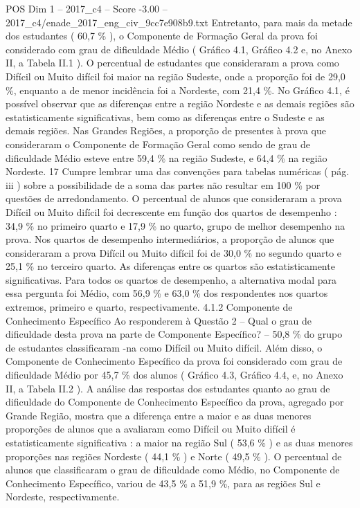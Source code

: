 \begin{textsample}{POS Dim 1 – 2017\_c4 – Score -3.00 – 2017\_c4/enade\_2017\_eng\_civ\_9cc7e908b9.txt}
Entretanto, para mais da metade dos estudantes ( 60,7 \% ), o Componente de Formação Geral da prova foi considerado com grau de dificuldade Médio ( Gráfico 4.1, Gráfico 4.2 e, no Anexo II, a Tabela II.1 ).
O percentual de estudantes que consideraram a prova como Difícil ou Muito difícil foi maior na região Sudeste, onde a proporção foi de 29,0 \%, enquanto a de menor incidência foi a Nordeste, com 21,4 \%.
No Gráfico 4.1, é possível observar que as diferenças entre a região Nordeste e as demais regiões são estatisticamente significativas, bem como as diferenças entre o Sudeste e as demais regiões.
Nas Grandes Regiões, a proporção de presentes à prova que consideraram o Componente de Formação Geral como sendo de grau de dificuldade Médio esteve entre 59,4 \% na região Sudeste, e 64,4 \% na região Nordeste. 17 Cumpre lembrar uma das convenções para tabelas numéricas ( pág. iii ) sobre a possibilidade de a soma das partes não resultar em 100 \% por questões de arredondamento.
O percentual de alunos que consideraram a prova Difícil ou Muito difícil foi decrescente em função dos quartos de desempenho : 34,9 \% no primeiro quarto e 17,9 \% no quarto, grupo de melhor desempenho na prova.
Nos quartos de desempenho intermediários, a proporção de alunos que consideraram a prova Difícil ou Muito difícil foi de 30,0 \% no segundo quarto e 25,1 \% no terceiro quarto.
As diferenças entre os quartos são estatisticamente significativas.
Para todos os quartos de desempenho, a alternativa modal para essa pergunta foi Médio, com 56,9 \% e 63,0 \% dos respondentes nos quartos extremos, primeiro e quarto, respectivamente. 4.1.2 Componente de Conhecimento Específico Ao responderem à Questão 2 – Qual o grau de dificuldade desta prova na parte de Componente Específico? – 50,8 \% do grupo de estudantes classificaram -na como Difícil ou Muito difícil.
Além disso, o Componente de Conhecimento Específico da prova foi considerado com grau de dificuldade Médio por 45,7 \% dos alunos ( Gráfico 4.3, Gráfico 4.4, e, no Anexo II, a Tabela II.2 ).
A análise das respostas dos estudantes quanto ao grau de dificuldade do Componente de Conhecimento Específico da prova, agregado por Grande Região, mostra que a diferença entre a maior e as duas menores proporções de alunos que a avaliaram como Difícil ou Muito difícil é estatisticamente significativa : a maior na região Sul ( 53,6 \% ) e as duas menores proporções nas regiões Nordeste ( 44,1 \% ) e Norte ( 49,5 \% ).
O percentual de alunos que classificaram o grau de dificuldade como Médio, no Componente de Conhecimento Específico, variou de 43,5 \% a 51,9 \%, para as regiões Sul e Nordeste, respectivamente.

\end{textsample}
